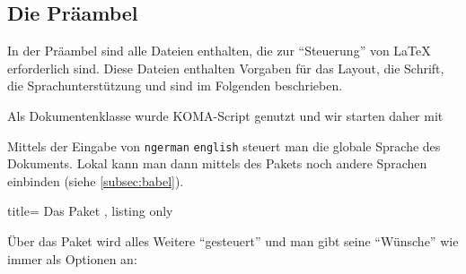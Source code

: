 \subsection{Die Präambel}\label{subsec:preamble}
%
In der Präambel sind alle Dateien enthalten, die zur \enquote{Steuerung} von \LaTeX{} erforderlich sind.
Diese Dateien enthalten Vorgaben für das Layout, die Schrift, die Sprachunterstützung \etc und sind im Folgenden beschrieben.

Als Dokumentenklasse wurde KOMA-Script genutzt und wir starten daher mit
%
%
Mittels der Eingabe von \texttt{ngerman} \bzw \texttt{english} steuert man die globale Sprache des Dokuments. 
Lokal kann man dann mittels des Pakets  noch andere Sprachen einbinden (siehe \vref{subsec:babel}).
\begin{tcblisting}{title= Das Paket , listing only}
\usepackage[%
	,numeric			%
	]{./preamble/agfa-art} 
\end{tcblisting}
Über das Paket  wird alles Weitere \enquote{gesteuert} und man gibt seine \enquote{Wünsche} wie immer als Optionen an:

